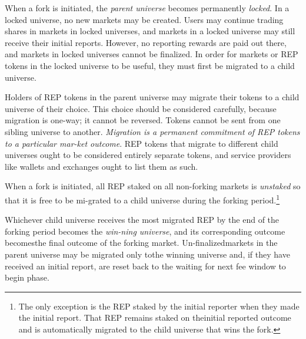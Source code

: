 \documentclass[12pt,floatfix,reprint,nofootinbib,amsmath,amssymb,epsfig,pre,floats,letterpaper,groupedaffiliation]{revtex4-1}
\theoremstyle{definition}
\theoremstyle{definition}
\begin{document}
When a fork is initiated, the \textit{parent universe} becomes permanently \textit{locked}. In a locked universe, no new markets may be created. Users may continue trading shares in markets in locked universes, and markets in a locked universe may still receive their initial reports. However, no reporting rewards are paid out there, and markets in locked universes cannot be finalized. In order for markets or REP tokens in the locked universe to be useful, they must first be migrated to a child universe.

Holders of REP tokens in the parent universe may migrate their tokens to a child universe of their choice. This choice should be considered carefully, because migration is one-way; it cannot be reversed. Tokens cannot be sent from one sibling universe to another. \textit{Migration is a permanent commitment of REP tokens to a particular mar-\linebreak ket outcome}. REP tokens that migrate to different child universes ought to be considered entirely separate tokens, and service providers like wallets and exchanges ought to list them as such.

When a fork is initiated, all REP staked on all non-forking markets is \textit{unstaked} so that it is free to be mi-\linebreak grated to a child universe during the forking period.\footnote{The only exception is the REP staked by the initial reporter when they made the initial report. That REP remains staked on the\linebreak initial reported outcome and is automatically migrated to the child universe that wins the fork.}

Whichever child universe receives the most migrated REP by the end of the forking period becomes the \textit{win-\linebreak ning universe}, and its corresponding outcome becomes\linebreak the final outcome of the forking market. Un-finalized\linebreak\vspace{\baselineskip}\vspace{0.3336\baselineskip}markets in the parent universe may be migrated only to\break\break the winning universe and, if they have received an initial report, are reset back to the waiting for next fee window to begin phase.
\end{document}
